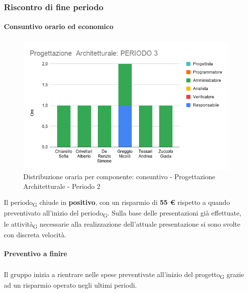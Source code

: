 \subsubsection{Riscontro di fine periodo}


\paragraph{Consuntivo orario ed economico}
\subparagraph*{}

\contabilitaTable{
	
}

\begin{figure}[H]
	\centering
	\includegraphics[scale=0.7]{res/images/charts/consuntivo/prog_arch_3.png}
	\caption{Distribuzione oraria per componente: consuntivo - Progettazione Architetturale - Periodo 2}
\end{figure}


Il periodo\textsubscript{G} chiude in \textbf{positivo}, con un risparmio di \textbf{55 \euro} rispetto a quando preventivato all'inizio del periodo\textsubscript{G}. Sulla base delle presentazioni già effettuate, le attività\textsubscript{G} necessarie alla realizzazione dell'attuale presentazione si sono svolte con discreta velocità.


\paragraph{Preventivo a finire}
\subparagraph*{}

\pafTable{
	
}

Il gruppo inizia a rientrare nelle spese preventivate all'inizio del progetto\textsubscript{G} grazie ad un risparmio operato negli ultimi periodi.